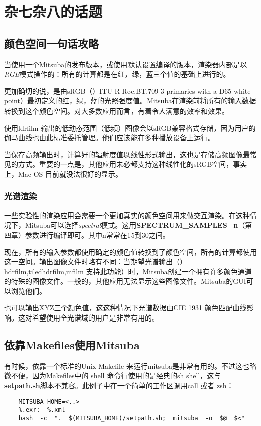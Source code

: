 \chapter{杂七杂八的话题}
\section{颜色空间一句话攻略}
当使用一个Mitsuba的发布版本，或使用默认设置编译的版本，渲染器内部是以\textit{RGB}模式操作的：所有的计算都是在红，绿，蓝三个值的基础上进行的。
\par 
更加确切的说，是由sRGB（）ITU-R Rec.BT.709-3 primaries with a D65 white point）最初定义的红，绿，蓝的光照强度值。Mitsuba在渲染前将所有的输入数据转换到这个颜色空间。对大多数应用而言，有着令人满意的效率和效果。
\par 
使用ldrfilm 输出的低动态范围（低频）图像会以sRGB兼容格式存储，因为用户的伽马曲线也由此标准委托管理。他们应该能在多种播放设备上运行。
\par 
当保存高频输出时，计算好的辐射度值以线性形式输出，这也是存储高频图像最常见的方式。重要的一点是，其他应用未必都支持这种线性化的sRGB空间，事实上，Mac OS 目前就没法很好的显示。
\subsection{光谱渲染}
一些实验性的渲染应用会需要一个更加真实的颜色空间用来做交互渲染。在这种情况下，Mitsuba可以选择\textit{spectral}模式。这用\textbf{SPECTRUM\_SAMPLES=n}（第四章）参数进行编译即可。其中n常常在15到30之间。
\par 
现在，所有的输入参数都使用确定的颜色值转换到了颜色空间，所有的计算都使用这一空间。输出图像文件时略有不同：当期望光谱输出（）hdrfilm,tiledhdrfilm,mfilm 支持此功能）时，Mitsuba创建一个拥有许多颜色通道的特殊的图像文件。一般的，其他应用无法显示这些图像文件。Mitsuba的GUI可以浏览他们。
\par 
也可以输出XYZ三个颜色值，这这种情况下光谱数据由CIE 1931 颜色匹配曲线影响。这对希望使用全光谱域的用户是非常有用的。

\section{依靠Makefiles使用Mitsuba}
有时候，依靠一个标准的Unix Makefile 来运行mitsuba是非常有用的。不过这也略微不便，因为Makefiles中的 shell 命令行使用的是经典的sh shell，这与\textbf{setpath.sh}脚本不兼容。此例子中在一个简单的工作区调用call 或者 zsh：
\begin{lstlisting}
	MITSUBA_HOME=<..>
	%.exr:  %.xml
	bash  -c  ".  $(MITSUBA_HOME)/setpath.sh;  mitsuba  -o  $@  $<"
\end{lstlisting}

